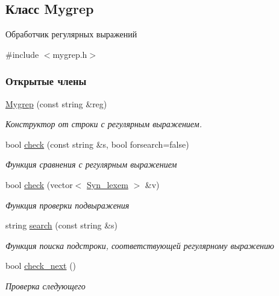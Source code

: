 \hypertarget{class_mygrep}{}\subsection{Класс Mygrep}
\label{class_mygrep}


Обработчик регулярных выражений  




{\ttfamily \#include $<$mygrep.\+h$>$}

\subsubsection*{Открытые члены}
\begin{DoxyCompactItemize}
\item 
\hyperlink{class_mygrep_aa2d9dfde7904f2232e6327249f4cd295}{Mygrep} (const string \&reg)
\begin{DoxyCompactList}\small\item\em Конструктор от строки с регулярным выражением. \end{DoxyCompactList}\item 
bool \hyperlink{class_mygrep_a17b4256c97b2e7e875d50bdc9985ef51}{check} (const string \&s, bool forsearch=false)
\begin{DoxyCompactList}\small\item\em Функция сравнения с регулярным выражением \end{DoxyCompactList}\item 
bool \hyperlink{class_mygrep_a684ae4e33ce76c8de17b5eadf987afe9}{check} (vector$<$ \hyperlink{class_syn__lexem}{Syn\+\_\+lexem} $>$ \&v)
\begin{DoxyCompactList}\small\item\em Функция проверки подвыражения \end{DoxyCompactList}\item 
string \hyperlink{class_mygrep_a3e4671ac445156bbbcd4f685d61871a5}{search} (const string \&s)
\begin{DoxyCompactList}\small\item\em Функция поиска подстроки, соответствующей регулярному выражению \end{DoxyCompactList}\item 
bool \hyperlink{class_mygrep_abd79a246feab0fe7548c79b9d887803d}{check\+\_\+next} ()
\begin{DoxyCompactList}\small\item\em Проверка следующего \end{DoxyCompactList}\end{DoxyCompactItemize}
